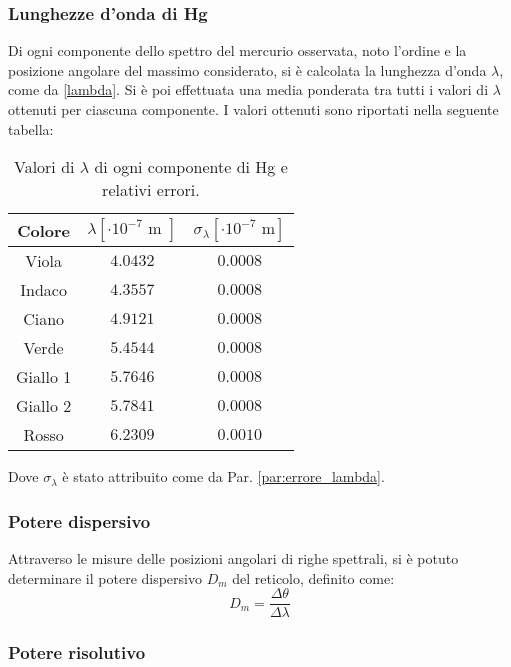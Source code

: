 \documentclass[]{article}
\begin{document}
    \subsubsection{Lunghezze d'onda di Hg}
    Di ogni componente dello spettro del mercurio osservata, noto l'ordine e la posizione angolare del massimo considerato, si è calcolata la lunghezza d'onda $\lambda$, come da \ref{lambda}. Si è poi effettuata una media ponderata tra tutti i valori di $\lambda$ ottenuti per ciascuna componente. I valori ottenuti sono riportati nella seguente tabella:
    \begin{table} [H]
        \centering
        \begin{tabular}{||c|c|c||}
            \hline
            Colore & $\lambda [\cdot 10^{-7}\text{ m }] $ & $ \sigma_{\lambda} [\cdot 10^{-7}\text{ m}] $\\
            \hline \hline
            Viola & $ 4.0432 $ & $ 0.0008 $ \\\hline
            Indaco & $ 4.3557 $ & $ 0.0008 $ \\\hline
            Ciano & $ 4.9121 $ & $ 0.0008 $ \\\hline
            Verde & $ 5.4544 $ & $ 0.0008 $ \\\hline
            Giallo 1 & $ 5.7646 $ & $ 0.0008 $ \\\hline
            Giallo 2 & $ 5.7841 $ & $ 0.0008 $ \\\hline
            Rosso & $ 6.2309 $ & $ 0.0010 $ \\\hline
        \end{tabular}
        \caption{Valori di $\lambda$ di ogni componente di Hg e relativi errori.}
        \label{lambda-Hg-values}
    \end{table}
    Dove $\sigma_{\lambda}$ è stato attribuito come da Par. \ref{par:errore_lambda}.

    \subsubsection{Potere dispersivo}
    Attraverso le misure delle posizioni angolari di righe spettrali, si è potuto determinare il potere dispersivo $D_{m}$ del reticolo, definito come:
    \begin{equation}
        D_m = \frac{\Delta \theta}{\Delta \lambda}
    \end{equation}

    \subsubsection{Potere risolutivo}
    
\end{document}
